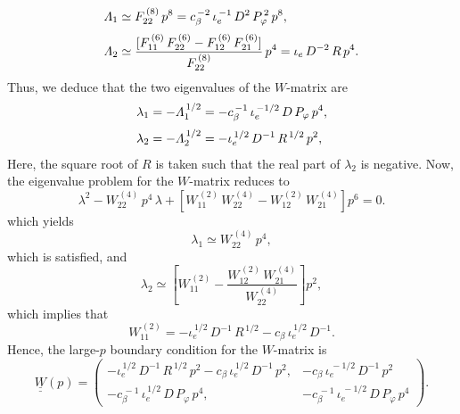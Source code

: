 \documentclass[12pt,prb,aps,notitlepage]{revtex4-1}
\begin{document}
 \begin{align}
 {\mit\Lambda}_1&\simeq F_{22}^{\,(8)}\,p^8=  c_\beta^{\,-2}\,\iota_e^{\,-1}\,D^2\,P_\varphi^{\,2}\,p^8,\\[0.5ex]
 {\mit\Lambda}_2 &\simeq \frac{[F_{11}^{\,(6)}\,F_{22}^{\,(6)} - F_{12}^{\,(6)}\,F_{21}^{\,(6)}]}{F_{22}^{\,(8)}}\,p^4= \iota_e\,D^{-2}\,R\,p^4.
 \end{align}
 Thus, we deduce that the two eigenvalues of the $W$-matrix are 
 \begin{align}
 \lambda_1&=-{\mit\Lambda}_1^{\,1/2}= -c_\beta^{\,-1}\,\iota_e^{\,-1/2}\,D\,P_\varphi\,p^4,\\[0.5ex]
 \lambda_2&=-{\mit\Lambda}_2^{\,1/2}=-\iota_e^{\,1/2}\,D^{-1}\,R^{\,1/2}\,p^2,
 \end{align}
 Here, the square root of $R$ is taken such that the real part of $\lambda_2$ is negative. 
  Now, the eigenvalue problem for the $W$-matrix reduces to 
 \begin{equation}
 \lambda^{2} - W_{22}^{\,(4)}\,p^4\,\lambda + \left[W_{11}^{\,(2)}\,W_{22}^{\,(4)} - W_{12}^{\,(2)}\,W_{21}^{\,(4)}\right]p^6 = 0.
 \end{equation}
which yields
\begin{equation}
\lambda_1\simeq W_{22}^{\,(4)}\,p^4,
\end{equation}
which is satisfied, and
\begin{equation}
\lambda_2 \simeq \left[W_{11}^{\,(2)} - \frac{W_{12}^{\,(2)}\,W_{21}^{\,(4)}}{W_{22}^{\,(4)}}\right]p^2,
\end{equation}
 which implies that
 \begin{equation}
 W_{11}^{\,(2)} = -\iota_e^{\,1/2}\,D^{-1}\,R^{\,1/2}-c_\beta\,\iota_e^{\,1/2}\,D^{-1}.
 \end{equation}
 Hence, the large-$p$ boundary condition for the $W$-matrix
 is
 \begin{equation}
 \underline{\underline{W}}(p) =  \left(\begin{array}{cc} -\iota_e^{\,1/2}\,D^{-1}\,R^{\,1/2}\,p^2-c_\beta\,\iota_e^{\,1/2}\,D^{-1}\,p^2,& - c_\beta\,\iota_e^{\,-1/2}\,D^{-1}\,p^2\\-c_\beta^{\,-1}\,\iota_e^{\,1/2}\,D\,P_\varphi\,p^4,&-c_\beta^{\,-1}\,\iota_e^{\,-1/2}\,D\,P_\varphi\,p^4\end{array}\right).
 \end{equation}
 
\end{document}
